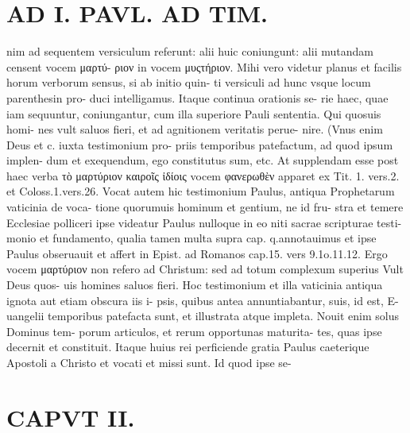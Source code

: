 \documentclass{article}
\begin{document}
\begin{pages}
\section*{AD I. PAVL. AD TIM. }
\marginpar{[ p.62 ]}\pstart nim ad sequentem versiculum referunt: alii huic coniungunt: alii mutandam censent vocem μαρτύ- ριον in vocem μυςτήριον. Mihi vero videtur planus et facilis horum verborum sensus, si ab initio quin- ti versiculi ad hunc vsque locum parenthesin pro- duci intelligamus. Itaque continua orationis se- rie haec, quae iam sequuntur, coniungantur, cum illa superiore Pauli sententia. Qui quosuis homi- nes vult saluos fieri, et ad agnitionem veritatis perue- nire. (Vnus enim Deus et c. iuxta testimonium pro- priis temporibus patefactum, ad quod ipsum implen- dum et exequendum, ego constitutus sum, etc. At supplendam esse post haec verba τὸ μαρτύριον καιροῖς ἰδίοις vocem φανερωθὲν apparet ex Tit. 1. vers.2. et Coloss.1.vers.26. Vocat autem hic testimonium Paulus, antiqua Prophetarum vaticinia de voca- tione quorumuis hominum et gentium, ne id fru- stra et temere Ecclesiae polliceri ipse videatur Paulus nulloque in eo niti sacrae scripturae testi- monio et fundamento, qualia tamen multa supra cap. q.annotauimus et ipse Paulus obseruauit et affert in Epist. ad Romanos cap.15. vers 9.1o.11.12. Ergo vocem μαρτύριον non refero ad Christum: sed ad totum complexum superius Vult Deus quos- uis homines saluos fieri. Hoc testimonium et illa vaticinia antiqua ignota aut etiam obscura iis i- psis, quibus antea annuntiabantur, suis, id est, E- uangelii temporibus patefacta sunt, et illustrata atque impleta. Nouit enim solus Dominus tem- porum articulos, et rerum opportunas maturita- tes, quas ipse decernit et constituit. Itaque huius rei perficiende gratia Paulus caeterique Apostoli a Christo et vocati et missi sunt. Id quod ipse se-  \pend
\section*{CAPVT  II. }\pstart {}
{}

\end{pages}
\end{document}
